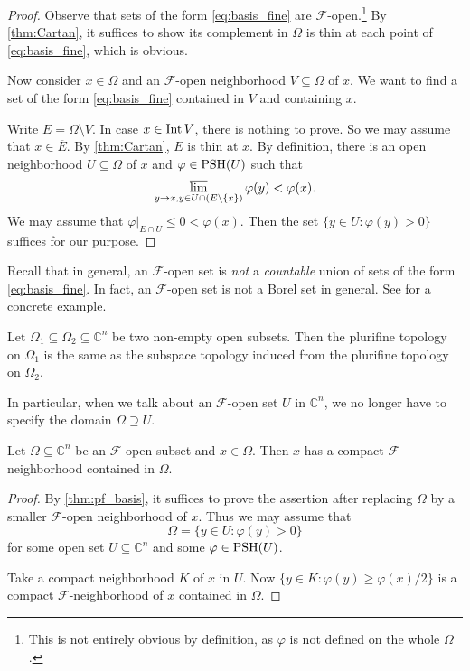 \begin{proof}
  Observe that sets of the form \eqref{eq:basis_fine} are $\mathcal{F}$-open.\footnote{This is not entirely obvious by definition, as $\varphi$ is not defined on the whole $\Omega$.} By \cref{thm:Cartan}, it suffices to show its complement in $\Omega$ is thin at each point of \eqref{eq:basis_fine}, which is obvious.

  Now consider $x\in \Omega$ and an $\mathcal{F}$-open neighborhood $V\subseteq \Omega$ of $x$. We want to find a set of the form \eqref{eq:basis_fine} contained in $V$ and containing $x$.

  Write $E=\Omega\setminus V$. In case $x\in \operatorname{Int} V$, there is nothing to prove. So we may assume that $x\in \overline{E}$. By \cref{thm:Cartan}, $E$ is thin at $x$. By definition, there is an open neighborhood $U\subseteq \Omega$ of $x$ and $\varphi\in \mathrm{PSH}(U)$ such that
  \[
    \varlimsup_{y\to x,y\in U\cap (E\setminus\{x\})}\varphi(y)<\varphi(x).
  \]
  We may assume that $\varphi|_{E\cap U}\leq 0<\varphi(x)$. Then the set $\{y\in U:\varphi(y)>0\}$ suffices for our purpose.
\end{proof}

\begin{remark}
    Recall that in general, an $\mathcal{F}$-open set is \emph{not} a \emph{countable} union of sets of the form \eqref{eq:basis_fine}. In fact, an $\mathcal{F}$-open set is not a Borel set in general.
    See \cite{EK23} for a concrete example.
\end{remark}

\begin{corollary}\label{cor:pf_compatible}
  Let $\Omega_1\subseteq \Omega_2\subseteq \mathbb{C}^n$ be two non-empty open subsets. Then the plurifine topology on $\Omega_1$ is the same as the subspace topology induced from the plurifine topology on $\Omega_2$.
\end{corollary}
In particular, when we talk about an $\mathcal{F}$-open set $U$ in $\mathbb{C}^n$, we no longer have to specify the domain $\Omega\supseteq U$.

\begin{corollary}\label{cor:compactnhformbase}
  Let $\Omega\subseteq \mathbb{C}^n$ be an $\mathcal{F}$-open subset and $x\in \Omega$. Then $x$ has a compact $\mathcal{F}$-neighborhood contained in $\Omega$.
\end{corollary}
\begin{proof}
  By \cref{thm:pf_basis}, it suffices to prove the assertion after replacing $\Omega$ by a smaller $\mathcal F$-open neighborhood of $x$. Thus we may assume that
    \[
        \Omega=\{y\in U:\varphi(y)>0\}
    \]
    for some open set $U\subseteq\mathbb C^n$ and some $\varphi\in\mathrm{PSH}(U)$.

  Take a compact neighborhood $K$ of $x$ in $U$. Now $\{y\in K: \varphi(y)\geq \varphi(x)/2\}$ is a compact $\mathcal{F}$-neighborhood of $x$ contained in $\Omega$.
\end{proof}

